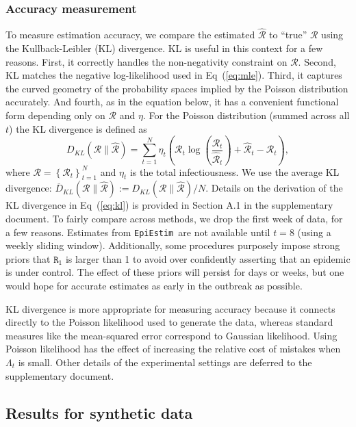 \documentclass[10pt,letterpaper]{article}
\newcommand{\R}{\texttt{R}}
\newcommand{\lr}[1]{\left(#1\right)}
\def\EpiEstim{\texttt{EpiEstim}}
\def\calR{\mathcal{R}}
\renewcommand{\eqref}[1]{Eq~(\ref{#1})}
\begin{document}
\subsubsection{Accuracy measurement}

To measure estimation accuracy, we compare the estimated $\widehat{\calR}$ to
``true'' $\calR$ using the Kullback-Leibler (KL) divergence. KL is useful in
this context for a few reasons. First, it correctly handles the non-negativity
constraint on $\calR$. Second, KL matches the negative log-likelihood used in
\eqref{eq:mle}. Third, it captures the curved geometry of the probability spaces
implied by the Poisson distribution accurately. And fourth, as in the equation
below, it has a convenient functional form depending only on $\calR$ and $\eta$.
For the Poisson distribution (summed across all $t$) the KL divergence is defined as
\begin{equation} \label{eq:kl}
  D_{KL}(\calR \parallel \widehat{\calR}) = \sum_{t=1}^N \eta_t \lr{\calR_t
  \log\left(\frac{\calR_t} {\widehat{\calR}_t}\right) + \widehat{\calR}_t -
{\calR}_t},
\end{equation}
where $\calR = \left\{ \calR_t \right\}_{t=1}^N$ and $\eta_t$ is the total
infectiousness. We use the average KL divergence: $\overline{D}_{KL}(\calR
\parallel \widehat{\calR}) := D_{KL}(\calR \parallel \widehat{\calR}) / N$.
Details on the derivation of the KL divergence in \eqref{eq:kl} is provided in
Section A.1 in the supplementary document. To fairly compare across methods, we
drop the first week of data, for a few reasons. Estimates from \EpiEstim\ are
not available until $t=8$ (using a weekly sliding window). Additionally, some
procedures purposely impose strong priors that $\R_1$ is larger than 1 to avoid
over confidently asserting that an epidemic is under control. The effect of
these priors will persist for days or weeks, but one would hope for accurate
estimates as early in the outbreak as possible.

KL divergence is
more appropriate for measuring accuracy because it connects directly to the
Poisson likelihood used to generate the data, whereas standard measures like the
mean-squared error correspond to Gaussian likelihood. Using Poisson likelihood
has the effect of increasing the relative cost of mistakes when $\Lambda_t$ is
small. Other details of the experimental settings are deferred to the 
supplementary document. 


\subsection{Results for synthetic data}
\end{document}
